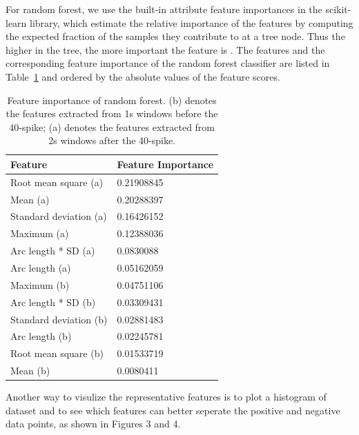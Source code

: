 \documentclass{soups}
\begin{document}
For random forest, we use the built-in attribute feature importances in the scikit-learn library, which estimate the relative importance of the features by computing the expected fraction of the samples they contribute to at a tree node. 
Thus the higher in the tree, the more important the feature is \cite{sklearn:rfdoc}. 
The features and the corresponding feature importance of the random forest classifier are listed in Table~\ref{tbl:importance-rf} and ordered by the absolute values of the feature scores. 

\begin{table}[H]
\centering
\begin{tabular}{@{}ll@{}}
\toprule
Feature                & Feature Importance \\ \midrule
Root mean square (a)   & 0.21908845         \\
Mean (a)               & 0.20288397         \\
Standard deviation (a) & 0.16426152         \\
Maximum (a)            & 0.12388036         \\
Arc length * SD (a)    & 0.0830088          \\
Arc length (a)         & 0.05162059         \\
Maximum (b)            & 0.04751106         \\
Arc length * SD (b)    & 0.03309431         \\
Standard deviation (b) & 0.02881483         \\
Arc length (b)         & 0.02245781         \\
Root mean square (b)   & 0.01533719         \\
Mean (b)               & 0.0080411          \\ \bottomrule
\end{tabular}
\caption{Feature importance of random forest. (b) denotes the features extracted from 1s windows before the 40-spike; (a) denotes the features extracted from 2s windows after the 40-spike.}
\label{tbl:importance-rf}
\end{table}

Another way to visulize the representative features is to plot a histogram of dataset and to see which features can better seperate the positive and negative data points, as shown in Figures 3 and 4.
\end{document}
